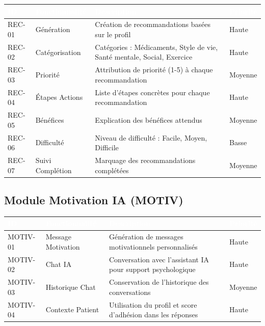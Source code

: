 \documentclass[12pt,a4paper]{report}
\begin{document}
\begin{longtable}{|p{2cm}|p{4cm}|p{7cm}|p{1.5cm}|}
    \hline
    \rowcolor{emsiblue}\textcolor{white}{\textbf{ID}} & \textcolor{white}{\textbf{Fonctionnalité}} & \textcolor{white}{\textbf{Description}} & \textcolor{white}{\textbf{Priorité}} \\
    \hline
    
    REC-01 & Génération & Création de recommandations basées sur le profil & Haute \\
    \hline
    REC-02 & Catégorisation & Catégories : Médicaments, Style de vie, Santé mentale, Social, Exercice & Haute \\
    \hline
    REC-03 & Priorité & Attribution de priorité (1-5) à chaque recommandation & Moyenne \\
    \hline
    REC-04 & Étapes Actions & Liste d'étapes concrètes pour chaque recommandation & Haute \\
    \hline
    REC-05 & Bénéfices & Explication des bénéfices attendus & Moyenne \\
    \hline
    REC-06 & Difficulté & Niveau de difficulté : Facile, Moyen, Difficile & Basse \\
    \hline
    REC-07 & Suivi Complétion & Marquage des recommandations complétées & Moyenne \\
    \hline
\end{longtable}

\subsection{Module Motivation IA (MOTIV)}

\begin{longtable}{|p{2cm}|p{4cm}|p{7cm}|p{1.5cm}|}
    \hline
    \rowcolor{emsiblue}\textcolor{white}{\textbf{ID}} & \textcolor{white}{\textbf{Fonctionnalité}} & \textcolor{white}{\textbf{Description}} & \textcolor{white}{\textbf{Priorité}} \\
    \hline
    
    MOTIV-01 & Message Motivation & Génération de messages motivationnels personnalisés & Haute \\
    \hline
    MOTIV-02 & Chat IA & Conversation avec l'assistant IA pour support psychologique & Haute \\
    \hline
    MOTIV-03 & Historique Chat & Conservation de l'historique des conversations & Moyenne \\
    \hline
    MOTIV-04 & Contexte Patient & Utilisation du profil et score d'adhésion dans les réponses & Haute \\
    \hline
\end{longtable}
\end{document}
